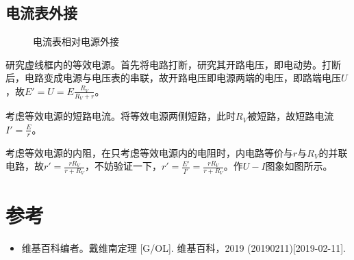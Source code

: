 \documentclass[UTF8,b5paper]{ctexart}
\newcommand{\dpm}[1]{$\displaystyle{#1}$}
\begin{document}
\subsection{电流表外接}
\begin{figure}[H]
  \centering
  \caption{电流表相对电源外接}
\end{figure}
研究虚线框内的等效电源。首先将电路打断，研究其开路电压，即电动势。打断后，电路变成电源与电压表的串联，故开路电压即电源两端的电压，即路端电压$U$，故\dpm{E'=U=E \frac{R_V}{R_V+r}}。

考虑等效电源的短路电流。将等效电源两侧短路，此时$R_V$被短路，故短路电流\dpm{I'=\frac E r}。

考虑等效电源的内阻，在只考虑等效电源内的电阻时，内电路等价与$r$与$R_V$的并联电路，故\dpm{r'=\frac{rR_V}{r + R_V}}，不妨验证一下，\dpm{r'=\frac{E'}{I'} = \frac{rR_V}{r + R_V}}。作$U-I$图象如图所示。
\section{参考}
\begin{itemize}
  \item 维基百科编者。戴维南定理 [G/OL]. 维基百科，2019 (20190211)[2019-02-11].


\end{itemize}
\end{document}
